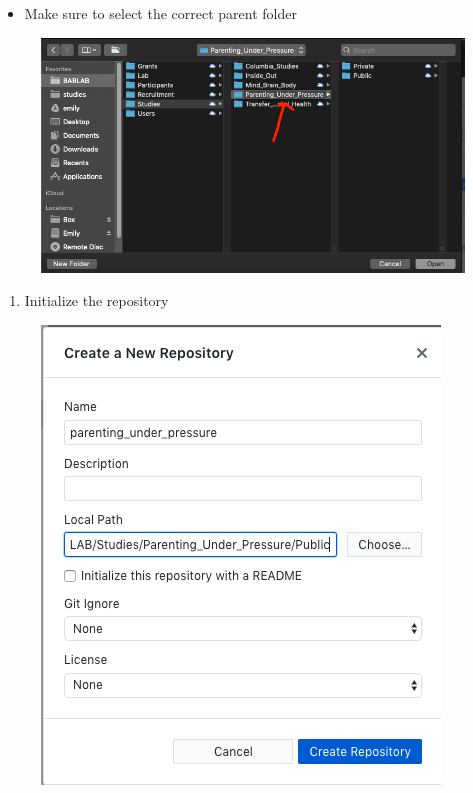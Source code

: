 \documentclass[]{book}
\providecommand{\tightlist}{%
  \setlength{\itemsep}{0pt}\setlength{\parskip}{0pt}}
\begin{document}
\begin{itemize}
\tightlist
\item
  Make sure to select the correct parent folder
\end{itemize}

\begin{figure}
\centering
\includegraphics{images/research_protocols/github/3.png}
\caption{}
\end{figure}

\begin{enumerate}
\def\labelenumi{\arabic{enumi}.}
\setcounter{enumi}{2}
\tightlist
\item
  Initialize the repository
\end{enumerate}

\begin{figure}
\centering
\includegraphics{images/research_protocols/github/4.png}
\caption{}
\end{figure}
\end{document}
